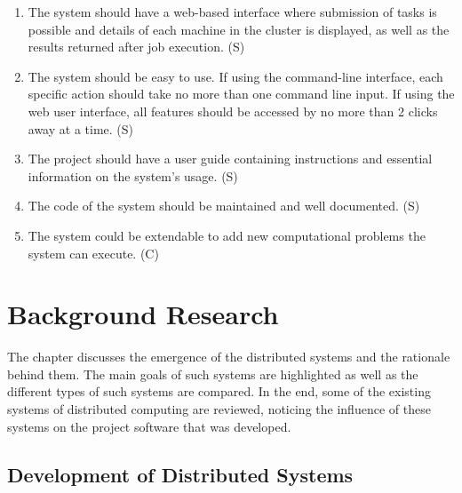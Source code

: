 \documentclass[10pt]{report}
\begin{document}
\begin{enumerate}
    \item The system should have a web-based interface where submission of tasks is possible and details of each machine in the cluster is displayed, as well as the results returned after job execution. (S)
    \item The system should be easy to use. If using the command-line interface, each specific action should take no more than one command line input. If using the web user interface, all features should be accessed by no more than 2 clicks away at a time. (S)
    \item The project should have a user guide containing instructions and essential information on the system's usage. (S)
    \item The code of the system should be maintained and well documented. (S)
    \item The system could be extendable to add new computational problems the system can execute. (C)

\end{enumerate}


\chapter{Background Research} \label{background}

The chapter discusses the emergence of the distributed systems and the rationale behind them. The main goals of such systems are highlighted as well as the different types of such systems are compared. In the end, some of the existing systems of distributed computing are reviewed, noticing the influence of these systems on the project software that was developed.

\section{Development of Distributed Systems}
\end{document}
